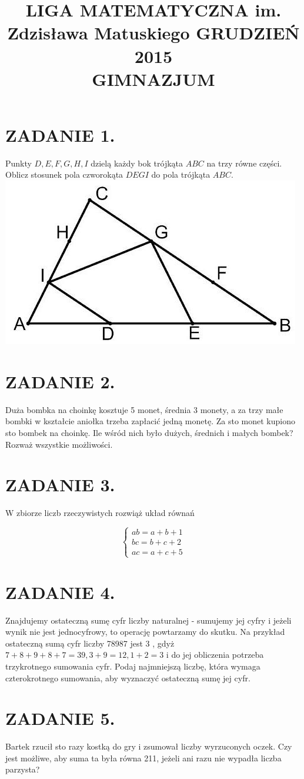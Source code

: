 \documentclass[10pt]{article}
\title{LIGA MATEMATYCZNA im. Zdzisława Matuskiego GRUDZIEŃ 2015 \\
 GIMNAZJUM }
\author{}
\date{}
\begin{document}
\maketitle
\section*{ZADANIE 1.}
Punkty \(D, E, F, G, H, I\) dzielą każdy bok trójkąta \(A B C\) na trzy równe części. Oblicz stosunek pola czworokąta \(D E G I\) do pola trójkąta \(A B C\).\\
\includegraphics[max width=\textwidth, center]{2024_11_21_8c59a2d079965ff631b7g-1}

\section*{ZADANIE 2.}
Duża bombka na choinkę kosztuje 5 monet, średnia 3 monety, a za trzy małe bombki w kształcie aniołka trzeba zapłacić jedną monetę. Za sto monet kupiono sto bombek na choinkę. Ile wśród nich było dużych, średnich i małych bombek? Rozważ wszystkie możliwości.

\section*{ZADANIE 3.}
W zbiorze liczb rzeczywistych rozwiąż układ równań

\[
\left\{\begin{array}{l}
a b=a+b+1 \\
b c=b+c+2 \\
a c=a+c+5
\end{array}\right.
\]

\section*{ZADANIE 4.}
Znajdujemy ostateczną sumę cyfr liczby naturalnej - sumujemy jej cyfry i jeżeli wynik nie jest jednocyfrowy, to operację powtarzamy do skutku. Na przykład ostateczną sumą cyfr liczby 78987 jest 3 , gdyż \(7+8+9+8+7=39,3+9=12,1+2=3\) i do jej obliczenia potrzeba trzykrotnego sumowania cyfr. Podaj najmniejszą liczbę, która wymaga czterokrotnego sumowania, aby wyznaczyć ostateczną sumę jej cyfr.

\section*{ZADANIE 5.}
Bartek rzucił sto razy kostką do gry i zsumował liczby wyrzuconych oczek. Czy jest możliwe, aby suma ta była równa 211, jeżeli ani razu nie wypadła liczba parzysta?
\end{document}

